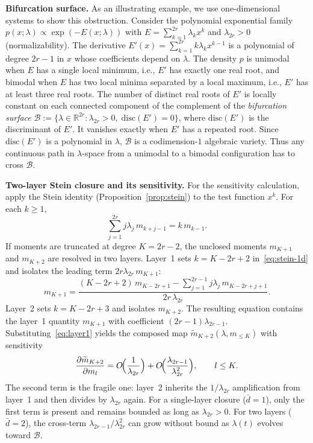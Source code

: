\documentclass{article}
\newcommand{\R}{\mathbb{R}}
\theoremstyle{definition}
\begin{document}
\textbf{Bifurcation surface.}
As an illustrating example, we use one-dimensional systems to show this obstruction. Consider the
polynomial exponential family
$p(x;\lambda) \propto \exp(-E(x;\lambda))$ with
$E = \sum_{k=1}^{2r}\lambda_k x^k$ and $\lambda_{2r} > 0$
(normalizability).
The derivative $E'(x) = \sum_{k=1}^{2r} k\lambda_k x^{k-1}$
is a polynomial of degree $2r{-}1$ in $x$ whose coefficients
depend on $\lambda$.
The density $p$ is unimodal when $E$ has a single local minimum,
i.e., $E'$ has exactly one real root,
and bimodal when $E$ has two local minima separated by a
local maximum, i.e., $E'$ has at least three real roots.
The number of distinct real roots of $E'$ is locally constant
on each connected component of the complement of the
\emph{bifurcation surface}
$\mathcal{B} := \{\lambda \in \R^{2r} : \lambda_{2r} > 0,\;
\mathrm{disc}(E') = 0\}$,
where $\mathrm{disc}(E')$ is the discriminant of $E'$.
It vanishes exactly when $E'$ has a repeated root.
Since $\mathrm{disc}(E')$ is a polynomial in $\lambda$,
$\mathcal{B}$ is a codimension-$1$ algebraic variety.
Thus any continuous path in $\lambda$-space from a unimodal to a
bimodal configuration has to cross $\mathcal{B}$.

\textbf{Two-layer Stein closure and its sensitivity.}
For the sensitivity calculation, apply the Stein identity
(Proposition~\ref{prop:stein}) to the test function $x^k$. For each
$k\ge 1$,
\begin{equation}\label{eq:stein-1d}
  \textstyle\sum_{j=1}^{2r} j\lambda_j\, m_{k+j-1}
  = k\, m_{k-1}.
\end{equation}
If moments are truncated at degree $K = 2r{-}2$, the unclosed moments
$m_{K+1}$ and $m_{K+2}$ are resolved in two layers.
Layer~1 sets $k = K{-}2r{+}2$ in~\eqref{eq:stein-1d}
and isolates the leading term $2r\lambda_{2r}\,m_{K+1}$:
\begin{equation}\label{eq:layer1}
  m_{K+1}
  = \frac{(K{-}2r{+}2)\, m_{K-2r+1}
         - \sum_{j=1}^{2r-1}j\lambda_j\,m_{K-2r+j+1}}
         {2r\,\lambda_{2r}}.
\end{equation}
Layer~2 sets $k = K{-}2r{+}3$ and isolates $m_{K+2}$.
The resulting equation contains the layer~1 quantity $m_{K+1}$ with
coefficient $(2r{-}1)\lambda_{2r-1}$.
Substituting~\eqref{eq:layer1} yields the composed map
$\widetilde{m}_{K+2}(\lambda, m_{\le K})$ with sensitivity
\begin{equation}\label{eq:two-layer-sens}
  \frac{\partial \widetilde{m}_{K+2}}{\partial m_l}
  = O\!\Bigl(\frac{1}{\lambda_{2r}}\Bigr)
  + O\!\Bigl(\frac{\lambda_{2r-1}}{\lambda_{2r}^2}\Bigr),
  \qquad l \le K.
\end{equation}
The second term is the fragile one: layer~2 inherits the
$1/\lambda_{2r}$ amplification from layer~1 and then divides by
$\lambda_{2r}$ again.
For a single-layer closure ($\bar{d} = 1$), only the first
term is present and remains bounded as long as $\lambda_{2r} > 0$.
For two layers ($\bar{d} = 2$), the cross-term
$\lambda_{2r-1}/\lambda_{2r}^2$ can grow without bound
as $\lambda(t)$ evolves toward $\mathcal{B}$.
\end{document}
